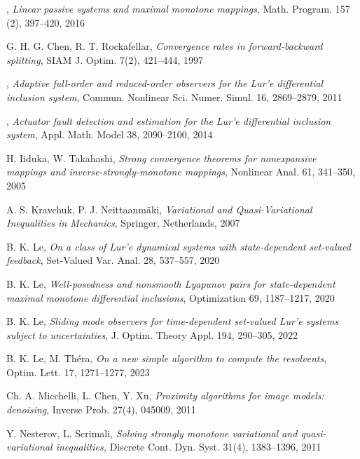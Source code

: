 \documentclass[11pt]{article}
\theoremstyle{plain}
\begin{document}
{\begin{thebibliography}{}
, {\it Linear passive systems and maximal monotone mappings}, Math. Program. 157 (2),  397--420, 2016


   {\sc G. H. G. Chen, R. T. Rockafellar}, {\it Convergence rates in forward-backward splitting}, SIAM J. Optim. 7(2), 421--444, 1997


,  {\it Adaptive full-order and reduced-order observers for the Lur'e differential inclusion system}, Commun. Nonlinear Sci. Numer. Simul. 16, 2869--2879, 2011

,   {\it Actuator fault detection and estimation for the Lur'e differential inclusion system}, Appl. Math. Model 38, 2090--2100, 2014

    {\sc H. Iiduka, W. Takahashi}, {\it Strong convergence theorems for nonexpansive mappings and
inverse-strongly-monotone mappings}, Nonlinear Anal. 61, 341--350, 2005
 
   {\sc A. S. Kravchuk, P. J. Neittaanm\"{a}ki}, {\it Variational and Quasi-Variational Inequalities in Mechanics}, Springer, Netherlands, 2007

 {\sc B. K. Le}, {\it On a class of  Lur'e dynamical systems with state-dependent set-valued feedback}, Set-Valued Var. Anal. 28, 537--557, 2020

 {\sc B. K. Le}, {\it Well-posedness and nonsmooth Lyapunov pairs for state-dependent maximal monotone differential inclusions}, Optimization 69, 1187--1217, 2020

 {\sc B. K. Le}, {\it Sliding mode observers for time-dependent set-valued Lur'e systems subject to uncertainties}, J. Optim. Theory Appl. 194, 290--305, 2022

 {\sc B. K. Le, M. Th\'era}, {\it On a new simple algorithm to compute the resolvents}, Optim. Lett. 17, 1271--1277, 2023


     {\sc Ch. A. Micchelli, L. Chen, Y. Xu}, \textit{Proximity algorithms for image models: denoising}, Inverse
Prob. 27(4), 045009, 2011


 {\sc Y. Nesterov, L. Scrimali},   {\it Solving strongly monotone variational and quasi-variational inequalities,} Discrete Cont. Dyn. Syst.  31(4), 1383--1396, 2011


\end{thebibliography}}
\end{document}
